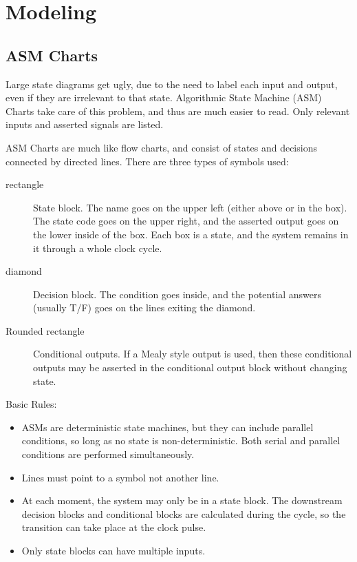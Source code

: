 \chapter{Modeling}

\section{ASM Charts}

Large state diagrams get ugly, due to the need to label each input and output, even if they are irrelevant to that state.  Algorithmic State Machine (ASM) Charts take care of this problem, and thus are much easier to read.  Only relevant inputs and asserted signals are listed.

ASM Charts are much like flow charts, and consist of states and decisions connected by directed lines. There are three types of symbols used:
\begin{description}
  \item[rectangle] State block.  The name goes on the upper left (either above or in the box).  The state code goes on the upper right, and the asserted output goes on the lower inside of the box.  Each box is a state, and the system remains in it through a whole clock cycle.
  \item[diamond] Decision block.  The condition goes inside, and the potential answers (usually T/F) goes on the lines exiting the diamond.
  \item[Rounded rectangle] Conditional outputs.  If a Mealy style output is used, then these conditional outputs may be asserted in the conditional output block without changing state.
\end{description}

Basic Rules:
\begin{itemize}
  \item ASMs are deterministic state machines, but they can include parallel conditions, so long as no state is non-deterministic.  Both serial and parallel conditions are performed simultaneously.
  \item Lines must point to a symbol not another line.
  \item At each moment, the system may only be in a state block.  The downstream decision blocks and conditional blocks are calculated during the cycle, so the transition can take place at the clock pulse.
  \item Only state blocks can have multiple inputs.
\end{itemize}

